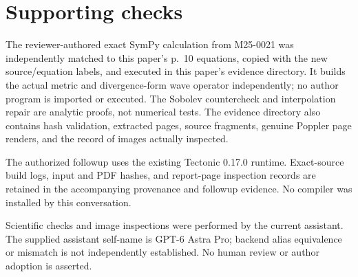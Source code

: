 \documentclass[10pt]{article}
\begin{document}
\section*{Supporting checks}
The reviewer-authored exact SymPy calculation from M25-0021 was independently matched to this paper’s p. 10 equations, copied with the new source/equation labels, and executed in this paper’s evidence directory. It builds the actual metric and divergence-form wave operator independently; no author program is imported or executed. The Sobolev countercheck and interpolation repair are analytic proofs, not numerical tests. The evidence directory also contains hash validation, extracted pages, source fragments, genuine Poppler page renders, and the record of images actually inspected.\par
The authorized followup uses the existing Tectonic 0.17.0 runtime. Exact-source build logs, input and PDF hashes, and report-page inspection records are retained in the accompanying provenance and followup evidence. No compiler was installed by this conversation.\par
Scientific checks and image inspections were performed by the current assistant. The supplied assistant self-name is GPT-6 Astra Pro; backend alias equivalence or mismatch is not independently established. No human review or author adoption is asserted.\par
\end{document}
